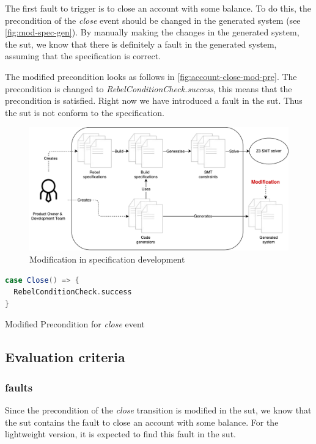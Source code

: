 The first fault to trigger is to close an account with some balance. To do this, the precondition of the \textit{close} event should be changed in the generated system (see \autoref{fig:mod-spec-gen}). By manually making the changes in the generated system, the \gls{sut}, we know that there is definitely a fault in the generated system, assuming that the specification is correct.

The modified precondition looks as follows in
\autoref{fig:account-close-mod-pre}. The precondition is changed to
\textit{RebelConditionCheck.success}, this means that the precondition is
satisfied. Right now we have introduced a fault in the \gls{sut}.
Thus the \gls{sut} is not conform to the specification.

\begin{figure}[h!]
  \centering
  \includegraphics[width=\linewidth{}]{figures/modified-sut.pdf}
  \caption{Modification in specification development}\label{fig:mod-spec-gen}
\end{figure}
\FloatBarrier

\begin{sourcecode}[h!]
\begin{lstlisting}[language=scala]
case Close() => {
  RebelConditionCheck.success
}
\end{lstlisting}
\caption{Modified Precondition for \textit{close} event}\label{fig:account-close-mod-pre}
\end{sourcecode}
\FloatBarrier

\subsection{Evaluation criteria}\label{sec:ch4-eval-criteria}

\subsubsection{faults}
Since the precondition of the \textit{close} transition is modified in the \gls{sut},
we know that the \gls{sut} contains the fault to close an account with some balance. For
the lightweight version, it is expected to find this fault in the \gls{sut}.

